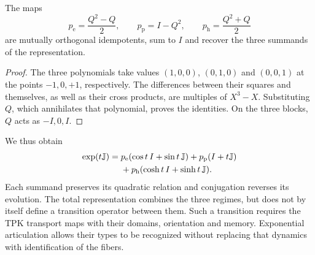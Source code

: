 \begin{proposition}
\label{x_reciprocidad:euler-trit-proyectores}
The maps
\[
 p_{\mathrm e}=\frac{Q^2-Q}{2},\qquad
 p_{\mathrm p}=I-Q^2,\qquad
 p_{\mathrm h}=\frac{Q^2+Q}{2}
\]
are mutually orthogonal idempotents, sum to \(I\) and recover the three
summands of the representation.
\end{proposition}
\begin{proof}
The three polynomials take values \((1,0,0)\), \((0,1,0)\) and
\((0,0,1)\) at the points \(-1,0,+1\), respectively. The differences
between their squares and themselves, as well as their cross products, are
multiples of \(X^3-X\). Substituting \(Q\), which annihilates that polynomial, proves
the identities. On the three blocks, \(Q\) acts as \(-I,0,I\).
\end{proof}

We thus obtain
\begin{align}
 \exp(t\mathbb J)
 ={}&p_{\mathrm e}(\cos t\,I+\sin t\,\mathbb J)
   +p_{\mathrm p}(I+t\mathbb J)\notag\\
   &+p_{\mathrm h}(\cosh t\,I+\sinh t\,\mathbb J).
 \label{x_reciprocidad:euler-trit-exponencial-total}
\end{align}
Each summand preserves its quadratic relation and conjugation reverses
its evolution. The total representation combines the three regimes, but does not
by itself define a transition operator between them. Such a transition
requires the TPK transport maps with their domains, orientation and
memory. Exponential articulation allows their types to be recognized without
replacing that dynamics with identification of the fibers.


